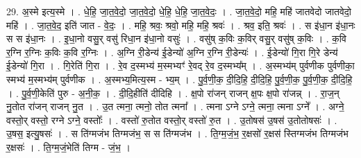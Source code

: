\documentclass[17pt]{extarticle}
\begin{document}
29. अ॒स्मे इत्य॒स्मे । . धे॒हि॒ जा॒त॒वे॒दो॒ जा॒त॒वे॒दो॒ धे॒हि॒ धे॒हि॒ जा॒त॒वे॒दः॒ । . जा॒त॒वे॒दो॒ महि॒ महि॑ जातवेदो जातवेदो॒ महि॑ । . जा॒त॒वे॒द॒ इति॑ जात - वे॒दः॒ । . महि॒ श्रवः॒ श्रवो॒ महि॒ महि॒ श्रवः॑ । . श्रव॒ इति॒ श्रवः॑ । . स इ॑धा॒न इ॑धा॒नः स स इ॑धा॒नः । . इ॒धा॒नो वसु॒र् वसु॑ रिधा॒न इ॑धा॒नो वसुः॑ । . वसु॑ष् क॒विः क॒विर् वसु॒र् वसु॑ष् क॒विः । . क॒वि र॒ग्नि र॒ग्निः क॒विः क॒वि र॒ग्निः । . अ॒ग्नि री॒डेन्य॑ ई॒डेन्यो॑ अ॒ग्नि र॒ग्नि री॒डेन्यः॑ । . ई॒डेन्यो॑ गि॒रा गि॒रे डेन्य॑ ई॒डेन्यो॑ गि॒रा । . गि॒रेति॑ गि॒रा । . रे॒व द॒स्मभ्य॑ म॒स्मभ्यꣳ॑ रे॒वद् रे॒व द॒स्मभ्य᳚म् । . अ॒स्मभ्य॑म् पुर्वणीक पुर्वणीका॒ स्मभ्य॑ म॒स्मभ्य॑म् पुर्वणीक । . अ॒स्मभ्य॒मित्य॒स्म - भ्य॒म् । . पु॒र्व॒णी॒क॒ दी॒दि॒हि॒ दी॒दि॒हि॒ पु॒र्व॒णी॒क॒ पु॒र्व॒णी॒क॒ दी॒दि॒हि॒ । . पु॒र्व॒णी॒केति॑ पुरु - अ॒नी॒क॒ । . दी॒दि॒हीति॑ दीदिहि । . क्ष॒पो रा॑जन् राजन् क्ष॒पः क्ष॒पो रा॑जन्न् । . रा॒ज॒न् नु॒तोत रा॑जन् राजन् नु॒त । . उ॒त त्मना॒ त्मनो॒ तोत त्मना᳚ । . त्मना ऽग्ने ऽग्ने॒ त्मना॒ त्मना ऽग्ने᳚ । . अग्ने॒ वस्तो॒र् वस्तो॒ रग्ने ऽग्ने॒ वस्तोः᳚ । . वस्तो॑ रु॒तोत वस्तो॒र् वस्तो॑ रु॒त । . उ॒तोषस॑ उ॒षस॑ उ॒तोतोषसः॑ । . उ॒षस॒ इत्यु॒षसः॑ । . स ति॑ग्मजंभ तिग्मजंभ॒ स स ति॑ग्मजंभ । . ति॒ग्म॒जं॒भ॒ र॒क्षसो॑ र॒क्षस॑ स्तिग्मजंभ तिग्मजंभ र॒क्षसः॑ । . ति॒ग्म॒जं॒भेति॑ तिग्म - जं॒भ॒ । \newline
\end{document}
